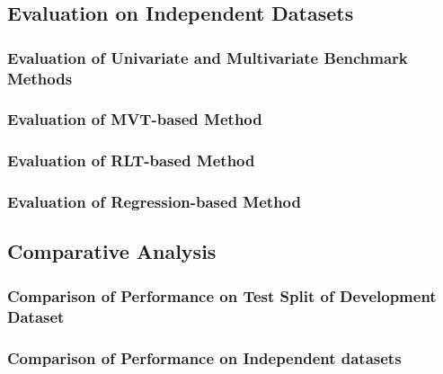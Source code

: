 \subsection{Evaluation on Independent Datasets}
\label{subsec:eval_independent}


\subsubsection{Evaluation of Univariate and Multivariate Benchmark Methods}
\label{subsubsec:eval_dev_indep}


\subsubsection{Evaluation of MVT-based Method}
\label{subsubsec:eval_mvt_indep}


\subsubsection{Evaluation of RLT-based Method}
\label{subsubsec:eval_rlt_indep}


\subsubsection{Evaluation of Regression-based Method}
\label{subsubsec:eval_regression_indep}



\subsection{Comparative Analysis}
\label{subsec:compar_anal}

\subsubsection{Comparison of Performance on Test Split of Development Dataset}
\label{subsubsec:perf_comp_dev}


\subsubsection{Comparison of Performance on Independent datasets}
\label{subsubsec:perf_comp_indep}


